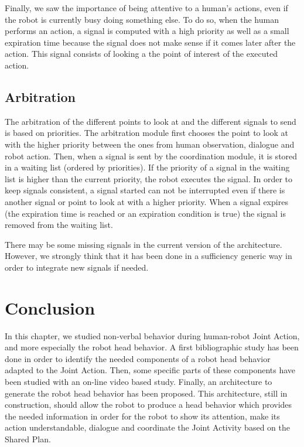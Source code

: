 \documentclass[english,a4paper,11pt,twoside]{StyleThese}
\begin{document}
Finally, we saw the importance of being attentive to a human's actions, even if the robot is currently busy doing something else. To do so, when the human performs an action, a signal is computed with a high priority as well as a small expiration time because the signal does not make sense if it comes later after the action. This signal consists of looking a the point of interest of the executed action. 

\subsection{Arbitration}

The arbitration of the different points to look at and the different signals to send is based on priorities. The arbitration module first chooses the point to look at with the higher priority between the ones from human observation, dialogue and robot action. Then, when a signal is sent by the coordination module, it is stored in a waiting list (ordered by priorities). If the priority of a signal in the waiting list is higher than the current priority, the robot executes the signal. In order to keep signals consistent, a signal started can not be interrupted even if there is another signal or point to look at with a higher priority. When a signal expires (the expiration time is reached or an expiration condition is true) the signal is removed from the waiting list.

There may be some missing signals in the current version of the architecture. However, we strongly think that it has been done in a sufficiency generic way in order to integrate new signals if needed.

\section{Conclusion}

In this chapter, we studied non-verbal behavior during human-robot Joint Action, and more especially the robot head behavior. A first bibliographic study has been done in order to identify the needed components of a robot head behavior adapted to the Joint Action. Then, some specific parts of these components have been studied with an on-line video based study. Finally, an architecture to generate the robot head behavior has been proposed. This architecture, still in construction, should allow the robot to produce a head behavior which provides the needed information in order for the robot to show its attention, make its action understandable, dialogue and coordinate the  Joint Activity based on the Shared Plan.

\ifdefined{}
\else


\end{document}
